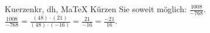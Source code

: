 \begin{MAufgabe}{Kuerzen}{kr, dh, MaTeX}
K\"urzen Sie soweit m\"oglich: $\frac{1008}{-768}$.\\ 
\ifLsg\MLoesung
\quad $\frac{1008}{-768}=\frac{(48)\cdot(21)}{(48)\cdot(-16)}=\frac{21}{-16}=\frac{-21}{16}$.\else\relax\fi
 \end{MAufgabe}